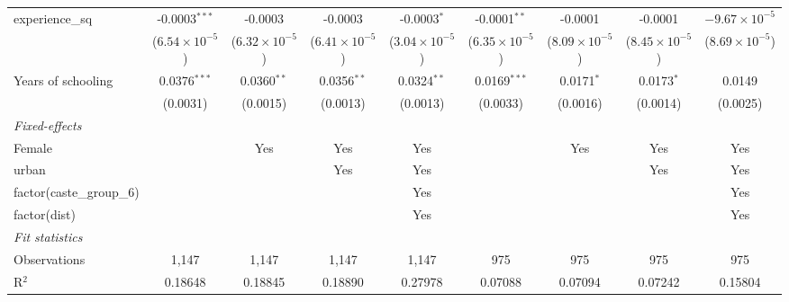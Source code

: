 \begin{table}[htbp]
\begin{tabular}{lcccccccc}
      experience\_sq            & -0.0003$^{***}$         & -0.0003                 & -0.0003                 & -0.0003$^{*}$           & -0.0001$^{**}$          & -0.0001                 & -0.0001                 & $-9.67\times 10^{-5}$\\    
                                & ($6.54\times 10^{-5}$)  & ($6.32\times 10^{-5}$)  & ($6.41\times 10^{-5}$)  & ($3.04\times 10^{-5}$)  & ($6.35\times 10^{-5}$)  & ($8.09\times 10^{-5}$)  & ($8.45\times 10^{-5}$)  & ($8.69\times 10^{-5}$)\\    
      Years of schooling        & 0.0376$^{***}$          & 0.0360$^{**}$           & 0.0356$^{**}$           & 0.0324$^{**}$           & 0.0169$^{***}$          & 0.0171$^{*}$            & 0.0173$^{*}$            & 0.0149\\   
                                & (0.0031)                & (0.0015)                & (0.0013)                & (0.0013)                & (0.0033)                & (0.0016)                & (0.0014)                & (0.0025)\\   
      \midrule
      \emph{Fixed-effects}\\
      Female                    &                         & Yes                     & Yes                     & Yes                     &                         & Yes                     & Yes                     & Yes\\  
      urban                     &                         &                         & Yes                     & Yes                     &                         &                         & Yes                     & Yes\\  
      factor(caste\_group\_6)   &                         &                         &                         & Yes                     &                         &                         &                         & Yes\\  
      factor(dist)              &                         &                         &                         & Yes                     &                         &                         &                         & Yes\\  
      \midrule
      \emph{Fit statistics}\\
      Observations              & 1,147                   & 1,147                   & 1,147                   & 1,147                   & 975                     & 975                     & 975                     & 975\\  
      R$^2$                     & 0.18648                 & 0.18845                 & 0.18890                 & 0.27978                 & 0.07088                 & 0.07094                 & 0.07242                 & 0.15804\\  

\end{tabular}
\end{table}
